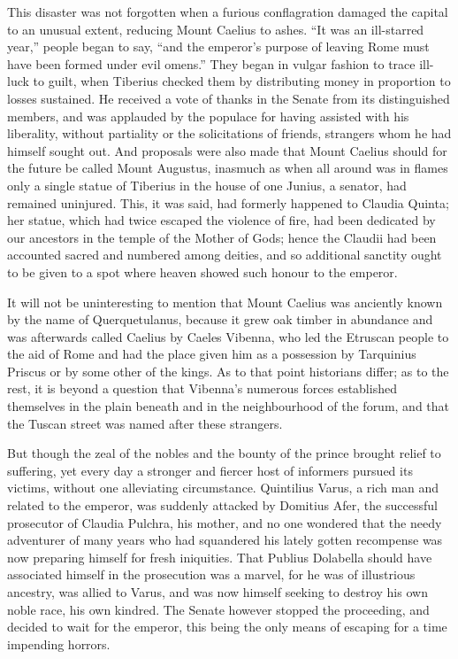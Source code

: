 
This disaster was not forgotten when a furious conflagration damaged the capital to an unusual extent, reducing Mount Caelius to ashes. ``It was an ill-starred year,'' people began to say, ``and the emperor's purpose of leaving Rome must have been formed under evil omens.'' They began in vulgar fashion to trace ill-luck to guilt, when Tiberius checked them by distributing money in proportion to losses sustained. He received a vote of thanks in the Senate from its distinguished members, and was applauded by the populace for having assisted with his liberality, without partiality or the solicitations of friends, strangers whom he had himself sought out. And proposals were also made that Mount Caelius should for the future be called Mount Augustus, inasmuch as when all around was in flames only a single statue of Tiberius in the house of one Junius, a senator, had remained uninjured. This, it was said, had formerly happened to Claudia Quinta; her statue, which had twice escaped the violence of fire, had been dedicated by our ancestors in the temple of the Mother of Gods; hence the Claudii had been accounted sacred and numbered among deities, and so additional sanctity ought to be given to a spot where heaven showed such honour to the emperor.


It will not be uninteresting to mention that Mount Caelius was anciently known by the name of Querquetulanus, because it grew oak timber in abundance and was afterwards called Caelius by Caeles Vibenna, who led the Etruscan people to the aid of Rome and had the place given him as a possession by Tarquinius Priscus or by some other of the kings. As to that point historians differ; as to the rest, it is beyond a question that Vibenna's numerous forces established themselves in the plain beneath and in the neighbourhood of the forum, and that the Tuscan street was named after these strangers.


But though the zeal of the nobles and the bounty of the prince brought relief to suffering, yet every day a stronger and fiercer host of informers pursued its victims, without one alleviating circumstance. Quintilius Varus, a rich man and related to the emperor, was suddenly attacked by Domitius Afer, the successful prosecutor of Claudia Pulchra, his mother, and no one wondered that the needy adventurer of many years who had squandered his lately gotten recompense was now preparing himself for fresh iniquities. That Publius Dolabella should have associated himself in the prosecution was a marvel, for he was of illustrious ancestry, was allied to Varus, and was now himself seeking to destroy his own noble race, his own kindred. The Senate however stopped the proceeding, and decided to wait for the emperor, this being the only means of escaping for a time impending horrors.

